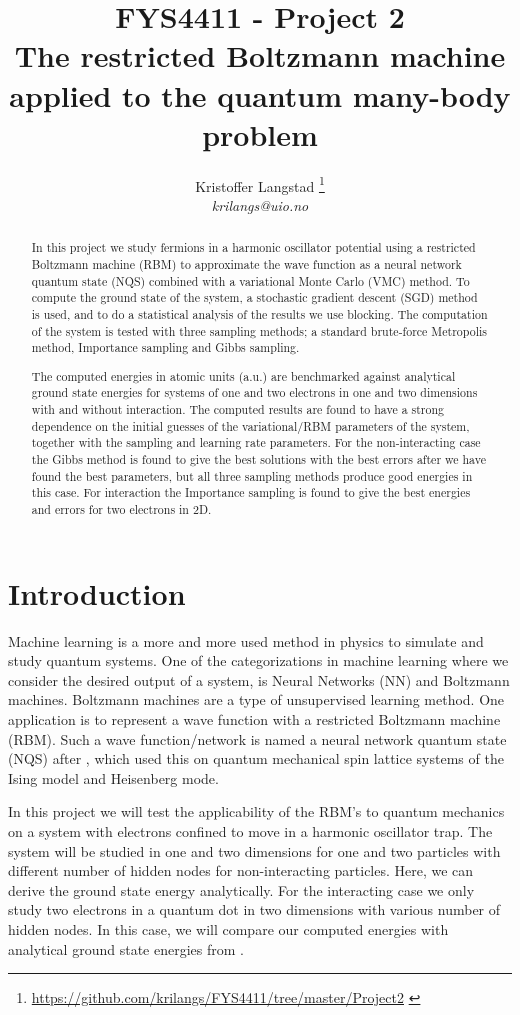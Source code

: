 \documentclass[12pt,a4paper,english]{article}
\title{FYS4411 - Project 2\\ The restricted Boltzmann machine applied to the quantum many-body problem}
\date{}
\author{ Kristoffer Langstad \footnote{\url{https://github.com/krilangs/FYS4411/tree/master/Project2} \cite{GitHub}}\\ \textit{krilangs@uio.no}}
\begin{document}
\maketitle
\begin{abstract}
In this project we study fermions in a harmonic oscillator potential using a restricted Boltzmann machine (RBM) to approximate the wave function as a neural network quantum state (NQS) combined with a variational Monte Carlo (VMC) method. To compute the ground state of the system, a stochastic gradient descent (SGD) method is used, and to do a statistical analysis of the results we use blocking. The computation of the system is tested with three sampling methods; a standard brute-force Metropolis method, Importance sampling and Gibbs sampling.

The computed energies in atomic units (a.u.) are benchmarked against analytical ground state energies for systems of one and two electrons in one and two dimensions with and without interaction. The computed results are found to have a strong dependence on the initial guesses of the variational/RBM parameters of the system, together with the sampling and learning rate parameters. For the non-interacting case the Gibbs method is found to give the best solutions with the best errors after we have found the best parameters, but all three sampling methods produce good energies in this case. For interaction the Importance sampling is found to give the best energies and errors for two electrons in 2D. 
\end{abstract}


\section{Introduction}
\label{sect:Introduction}
Machine learning is a more and more used method in physics to simulate and study quantum systems. One of the categorizations in machine learning where we consider the desired output of a system, is Neural Networks (NN) and Boltzmann machines. Boltzmann machines are a type of unsupervised learning method. One application is to represent a wave function with a restricted Boltzmann machine (RBM). Such a wave function/network is named a neural network quantum state (NQS) after \citet{carleo2017solving}, which used this on quantum mechanical spin lattice systems of the Ising model and Heisenberg mode.

In this project we will test the applicability of the RBM's to quantum mechanics on a system with electrons confined to move in a harmonic oscillator trap. The system will be studied in one and two dimensions for one and two particles with different number of hidden nodes for non-interacting particles. Here, we can derive the ground state energy analytically. For the interacting case we only study two electrons in a quantum dot in two dimensions with various number of hidden nodes. In this case, we will compare our computed energies with analytical ground state energies from \citet{taut1993two}.
\end{document}
